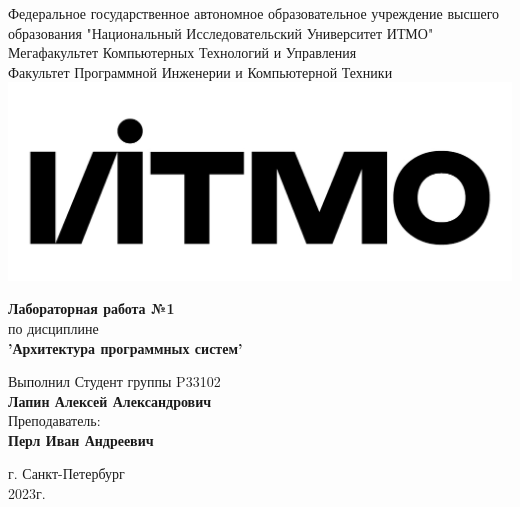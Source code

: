 \documentclass[12pt,onecolumn]{article}
\begin{document}
\setcounter{tocdepth}{4}
\begin{center}
    Федеральное государственное автономное образовательное учреждение высшего образования "Национальный Исследовательский Университет ИТМО"\\ 
    Мегафакультет Компьютерных Технологий и Управления\\
    Факультет Программной Инженерии и Компьютерной Техники \\
    \includegraphics[scale=0.3]{image/itmo.jpg} %
\end{center}
\vspace{1cm}


\begin{center}
    \textbf{Лабораторная работа №1}\\
    по дисциплине\\
    \textbf{'Архитектура программных систем'}\\
\end{center}

\vspace{2cm}

\begin{flushright}
  Выполнил Студент  группы P33102\\
  \textbf{Лапин Алексей Александрович}\\
  Преподаватель: \\
  \textbf{Перл Иван Андреевич}\\
\end{flushright}

\vspace{6cm}
\begin{center}
    г. Санкт-Петербург\\
    2023г.
\end{center}

\newpage
\tableofcontents
\newpage
\end{document}
